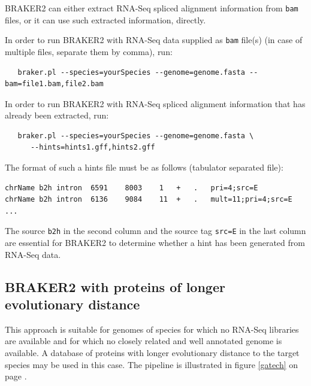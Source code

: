 \documentclass[a4paper,10pt]{report}
\begin{document}
BRAKER2 can either extract RNA-Seq spliced alignment information from \texttt{bam} files, or it can use such extracted information, directly.

In order to run BRAKER2 with RNA-Seq data supplied as \texttt{bam} file(s) (in case of multiple files, separate them by comma), run:

\begin{verbatim}
   braker.pl --species=yourSpecies --genome=genome.fasta --bam=file1.bam,file2.bam
\end{verbatim}

In order to run BRAKER2 with RNA-Seq spliced alignment information that has already been extracted, run:

\begin{verbatim}
   braker.pl --species=yourSpecies --genome=genome.fasta \
      --hints=hints1.gff,hints2.gff
\end{verbatim}

The format of such a hints file must be as follows (tabulator separated file):

\begin{verbatim}
chrName	b2h	intron	6591	8003	1	+	.	pri=4;src=E
chrName	b2h	intron	6136	9084	11	+	.	mult=11;pri=4;src=E
...
\end{verbatim}

The source \texttt{b2h} in the second column and the source tag \texttt{src=E} in the last column are essential for BRAKER2 to determine whether a hint has been generated from RNA-Seq data. 

\subsection{BRAKER2 with proteins of longer evolutionary distance}

This approach is suitable for genomes of species for which no RNA-Seq libraries are available and for which no closely related and well annotated genome is available. A database of proteins with longer evolutionary distance to the target species may be used in this case. The pipeline is illustrated in figure \ref{gatech} on page \pageref{gatech}.
\end{document}
